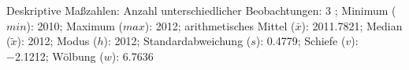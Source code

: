 				\label{tableValues:cend08_g1}
				\vspace*{-\baselineskip}
                    \begin{noten}
                	    \note{} Deskriptive Maßzahlen:
                	    Anzahl unterschiedlicher Beobachtungen: 3%
                	    ; 
                	      Minimum ($min$): 2010; 
                	      Maximum ($max$): 2012; 
                	      arithmetisches Mittel ($\bar{x}$): \num[round-mode=places,round-precision=2]{2011.7821}; 
                	      Median ($\tilde{x}$): 2012; 
                	      Modus ($h$): 2012; 
                	      Standardabweichung ($s$): \num[round-mode=places,round-precision=2]{0.4779}; 
                	      Schiefe ($v$): \num[round-mode=places,round-precision=2]{-2.1212}; 
                	      Wölbung ($w$): \num[round-mode=places,round-precision=2]{6.7636}
                     \end{noten}

